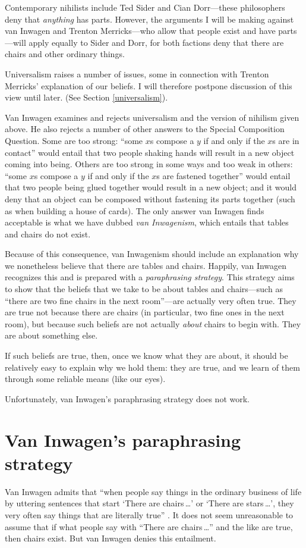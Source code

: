 \documentclass[11pt]{article}
\begin{document}
\begin{spacing}{1.5}
Contemporary nihilists include Ted Sider and Cian Dorr---these
philosophers deny that {\em anything} has parts.  However, the
arguments I will be making against van Inwagen and Trenton
Merricks---who allow that people exist and have parts---will apply
equally to Sider and Dorr, for both factions deny that there are
chairs and other ordinary things.

Universalism raises a number of issues, some in connection with
Trenton Merricks' explanation of our beliefs.  I will therefore
postpone discussion of this view until later.  (See Section
\ref{universalism}).

Van Inwagen examines and rejects universalism and the version of
nihilism given above.  He also rejects a number of other answers to
the Special Composition Question.  Some are too strong: ``some $x$s
compose a $y$ if and only if the $x$s are in contact'' would entail
that two people shaking hands will result in a new object coming into
being.  Others are too strong in some ways and too weak in others:
``some $x$s compose a $y$ if and only if the $x$s are fastened
together'' would entail that two people being glued together would
result in a new object; and it would deny that an object can be
composed without fastening its parts together (such as when building a
house of cards).  The only answer van Inwagen finds acceptable is what
we have dubbed {\em van Inwagenism}, which entails that tables and
chairs do not exist.

Because of this consequence, van Inwagenism should include an
explanation why we nonetheless believe that there are tables and
chairs.  Happily, van Inwagen recognizes this and is prepared with a
{\em paraphrasing strategy}.  This strategy aims to show that the
beliefs that we take to be about tables and chairs---such as ``there
are two fine chairs in the next room''---are actually very often true.
They are true not because there are chairs (in particular, two fine
ones in the next room), but because such beliefs are not actually {\em
  about} chairs to begin with.  They are about something else.

If such beliefs are true, then, once we know what they are about, it
should be relatively easy to explain why we hold them: they are true,
and we learn of them through some reliable means (like our eyes).

Unfortunately, van Inwagen's paraphrasing strategy does not work.

\section{Van Inwagen's paraphrasing strategy}
\label{i-para}
Van Inwagen admits that ``when people say things in the ordinary
business of life by uttering sentences that start `There are
chairs\,\ldots ' or `There are stars\,\ldots ', they very often say
things that are literally true'' \cite[102]{inwagen1995}.  It does not
seem unreasonable to assume that if what people say with ``There are
chairs\,\ldots '' and the like are true, then chairs exist.  But van
Inwagen denies this entailment.


\end{spacing}
\end{document}
